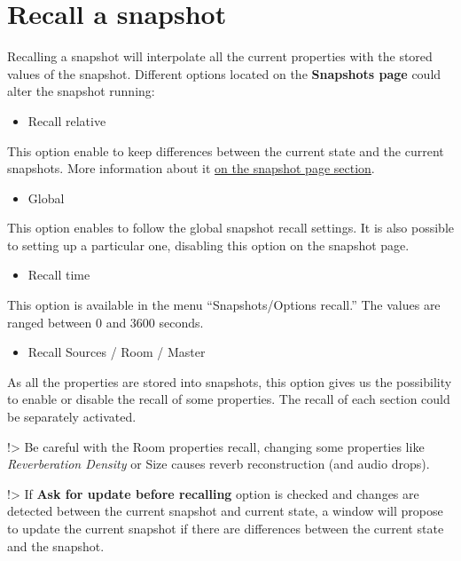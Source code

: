 \documentclass[
  letterpaper,
  DIV=11,
  numbers=noendperiod]{scrreport}
\providecommand{\tightlist}{%
  \setlength{\itemsep}{0pt}\setlength{\parskip}{0pt}}\usepackage{longtable,booktabs,array}
\begin{document}
\hypertarget{recall-a-snapshot}{%
\section{Recall a snapshot}\label{recall-a-snapshot}}

Recalling a snapshot will interpolate all the current properties with
the stored values of the snapshot. Different options located on the
\textbf{Snapshots page} could alter the snapshot running:

\begin{itemize}
\tightlist
\item
  Recall relative
\end{itemize}

This option enable to keep differences between the current state and the
current snapshots. More information about it
\href{Spat_Environment_Snapshot_Page.md}{on the snapshot page section}.

\begin{itemize}
\tightlist
\item
  Global
\end{itemize}

This option enables to follow the global snapshot recall settings. It is
also possible to setting up a particular one, disabling this option on
the snapshot page.

\begin{itemize}
\tightlist
\item
  Recall time
\end{itemize}

This option is available in the menu ``Snapshots/Options recall.'' The
values are ranged between 0 and 3600 seconds.

\begin{itemize}
\tightlist
\item
  Recall Sources / Room / Master
\end{itemize}

As all the properties are stored into snapshots, this option gives us
the possibility to enable or disable the recall of some properties. The
recall of each section could be separately activated.

!\textgreater{} Be careful with the Room properties recall, changing
some properties like \emph{Reverberation Density} or Size causes reverb
reconstruction (and audio drops).

!\textgreater{} If \textbf{Ask for update before recalling} option is
checked and changes are detected between the current snapshot and
current state, a window will propose to update the current snapshot if
there are differences between the current state and the snapshot.
\end{document}
